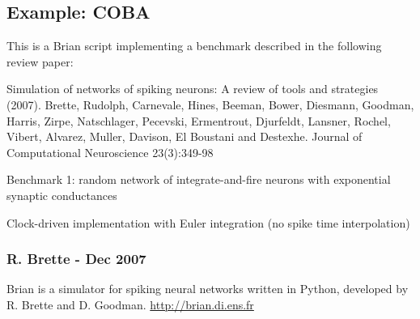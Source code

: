 \documentclass[letterpaper,10pt]{manual}
\begin{document}
\hypertarget{index-19}{}\subsection{Example: COBA}

This is a Brian script implementing a benchmark described
in the following review paper:

Simulation of networks of spiking neurons: A review of tools and strategies (2007).
Brette, Rudolph, Carnevale, Hines, Beeman, Bower, Diesmann, Goodman, Harris, Zirpe,
Natschlager, Pecevski, Ermentrout, Djurfeldt, Lansner, Rochel, Vibert, Alvarez, Muller,
Davison, El Boustani and Destexhe.
Journal of Computational Neuroscience 23(3):349-98

Benchmark 1: random network of integrate-and-fire neurons with exponential synaptic conductances

Clock-driven implementation with Euler integration
(no spike time interpolation)


\subsubsection{R. Brette - Dec 2007}

Brian is a simulator for spiking neural networks written in Python, developed by
R. Brette and D. Goodman.
\href{http://brian.di.ens.fr}{http://brian.di.ens.fr}
\end{document}
